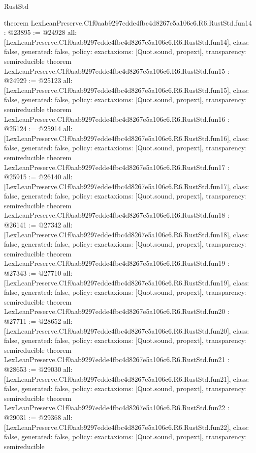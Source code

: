 \begin{lexlean}{RustStd}
\begin{coremodule}
{}
theorem LexLeanPreserve.C1f0aab9297edde4fbc4d8267e5a106c6.R6.RustStd.fun14 : @23895 := @24928 {
  all: [LexLeanPreserve.C1f0aab9297edde4fbc4d8267e5a106c6.R6.RustStd.fun14],
  class: false,
  generated: false,
  policy: exact{axioms: [Quot.sound, propext]},
  transparency: semireducible
}
theorem LexLeanPreserve.C1f0aab9297edde4fbc4d8267e5a106c6.R6.RustStd.fun15 : @24929 := @25123 {
  all: [LexLeanPreserve.C1f0aab9297edde4fbc4d8267e5a106c6.R6.RustStd.fun15],
  class: false,
  generated: false,
  policy: exact{axioms: [Quot.sound, propext]},
  transparency: semireducible
}
theorem LexLeanPreserve.C1f0aab9297edde4fbc4d8267e5a106c6.R6.RustStd.fun16 : @25124 := @25914 {
  all: [LexLeanPreserve.C1f0aab9297edde4fbc4d8267e5a106c6.R6.RustStd.fun16],
  class: false,
  generated: false,
  policy: exact{axioms: [Quot.sound, propext]},
  transparency: semireducible
}
theorem LexLeanPreserve.C1f0aab9297edde4fbc4d8267e5a106c6.R6.RustStd.fun17 : @25915 := @26140 {
  all: [LexLeanPreserve.C1f0aab9297edde4fbc4d8267e5a106c6.R6.RustStd.fun17],
  class: false,
  generated: false,
  policy: exact{axioms: [Quot.sound, propext]},
  transparency: semireducible
}
theorem LexLeanPreserve.C1f0aab9297edde4fbc4d8267e5a106c6.R6.RustStd.fun18 : @26141 := @27342 {
  all: [LexLeanPreserve.C1f0aab9297edde4fbc4d8267e5a106c6.R6.RustStd.fun18],
  class: false,
  generated: false,
  policy: exact{axioms: [Quot.sound, propext]},
  transparency: semireducible
}
theorem LexLeanPreserve.C1f0aab9297edde4fbc4d8267e5a106c6.R6.RustStd.fun19 : @27343 := @27710 {
  all: [LexLeanPreserve.C1f0aab9297edde4fbc4d8267e5a106c6.R6.RustStd.fun19],
  class: false,
  generated: false,
  policy: exact{axioms: [Quot.sound, propext]},
  transparency: semireducible
}
theorem LexLeanPreserve.C1f0aab9297edde4fbc4d8267e5a106c6.R6.RustStd.fun20 : @27711 := @28652 {
  all: [LexLeanPreserve.C1f0aab9297edde4fbc4d8267e5a106c6.R6.RustStd.fun20],
  class: false,
  generated: false,
  policy: exact{axioms: [Quot.sound, propext]},
  transparency: semireducible
}
theorem LexLeanPreserve.C1f0aab9297edde4fbc4d8267e5a106c6.R6.RustStd.fun21 : @28653 := @29030 {
  all: [LexLeanPreserve.C1f0aab9297edde4fbc4d8267e5a106c6.R6.RustStd.fun21],
  class: false,
  generated: false,
  policy: exact{axioms: [Quot.sound, propext]},
  transparency: semireducible
}
theorem LexLeanPreserve.C1f0aab9297edde4fbc4d8267e5a106c6.R6.RustStd.fun22 : @29031 := @29368 {
  all: [LexLeanPreserve.C1f0aab9297edde4fbc4d8267e5a106c6.R6.RustStd.fun22],
  class: false,
  generated: false,
  policy: exact{axioms: [Quot.sound, propext]},
  transparency: semireducible
}
\end{coremodule}
\end{lexlean}
